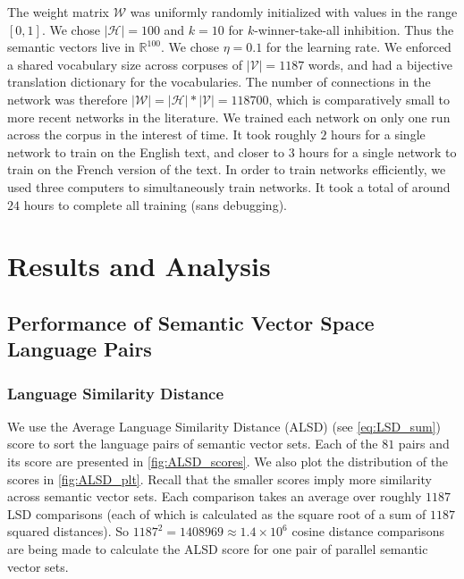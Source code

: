 \documentclass[12pt, usenames]{article}
\theoremstyle{definition}
\theoremstyle{definition}
\theoremstyle{definition}
\newcommand{\mc}[1]
{\mathcal{#1}}
\begin{document}
The weight matrix $\mc{W}$ was uniformly randomly initialized with values in the range $[0, 1]$.
We chose $|\mc{H}| = 100$ and $k = 10$ for $k$-winner-take-all inhibition. Thus the semantic vectors live in $\mathbb{R}^{100}$. We chose $\eta = 0.1$ for the learning rate. We enforced a shared vocabulary size across corpuses of $|\mc{V}| = 1187$ words, and had a bijective translation dictionary for the vocabularies. The number of connections in the network was therefore $|\mc{W}| = |\mc{H}| * |\mc{V}| = 118700$, which is comparatively small to more recent networks in the literature. We trained each network on only one run across the corpus in the interest of time. It took roughly $2$ hours for a single network to train on the English text, and closer to $3$ hours for a single network to train on the French version of the text. 
In order to train networks efficiently, we used three computers to simultaneously train networks. It took a total of around $24$ hours to complete all training (sans debugging). 



\section{Results and Analysis}

\subsection{Performance of Semantic Vector Space Language Pairs}

\subsubsection{Language Similarity Distance}
We use the Average Language Similarity Distance (ALSD) (see \autoref{eq:LSD_sum}) score to sort the language pairs of semantic vector sets. Each of the $81$ pairs and its score are presented in \autoref{fig:ALSD_scores}. We also plot the distribution of the scores in \autoref{fig:ALSD_plt}. Recall that the smaller scores imply more similarity across semantic vector sets. Each comparison takes an average over roughly $1187$ LSD comparisons (each of which is calculated as the square root of a sum of $1187$ squared distances). So $1187^2 = 1408969 \approx 1.4 \times 10^6$ cosine distance comparisons are being made to calculate the ALSD score for one pair of parallel semantic vector sets. 
\end{document}
